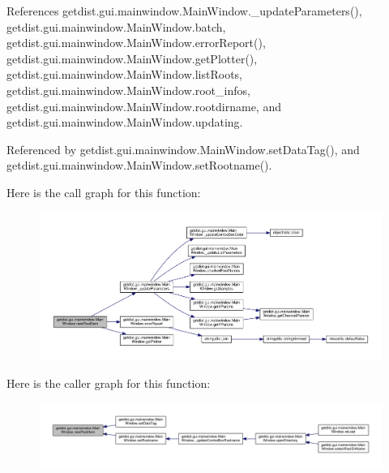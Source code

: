 References getdist.\+gui.\+mainwindow.\+Main\+Window.\+\_\+update\+Parameters(), getdist.\+gui.\+mainwindow.\+Main\+Window.\+batch, getdist.\+gui.\+mainwindow.\+Main\+Window.\+error\+Report(), getdist.\+gui.\+mainwindow.\+Main\+Window.\+get\+Plotter(), getdist.\+gui.\+mainwindow.\+Main\+Window.\+list\+Roots, getdist.\+gui.\+mainwindow.\+Main\+Window.\+root\+\_\+infos, getdist.\+gui.\+mainwindow.\+Main\+Window.\+rootdirname, and getdist.\+gui.\+mainwindow.\+Main\+Window.\+updating.



Referenced by getdist.\+gui.\+mainwindow.\+Main\+Window.\+set\+Data\+Tag(), and getdist.\+gui.\+mainwindow.\+Main\+Window.\+set\+Rootname().

Here is the call graph for this function\+:
\nopagebreak
\begin{figure}[H]
\begin{center}
\leavevmode
\includegraphics[width=350pt]{classgetdist_1_1gui_1_1mainwindow_1_1MainWindow_acffec8bd5390cacd428e909ef4cfa449_cgraph}
\end{center}
\end{figure}
Here is the caller graph for this function\+:
\nopagebreak
\begin{figure}[H]
\begin{center}
\leavevmode
\includegraphics[width=350pt]{classgetdist_1_1gui_1_1mainwindow_1_1MainWindow_acffec8bd5390cacd428e909ef4cfa449_icgraph}
\end{center}
\end{figure}
\mbox{\label{classgetdist_1_1gui_1_1mainwindow_1_1MainWindow_ab4eed3e548a98ed4b789a5cf9324027a}} 
